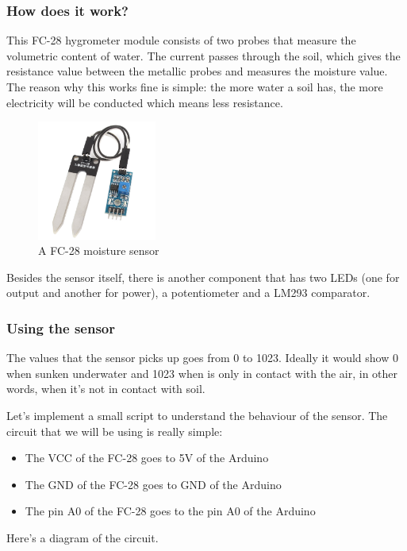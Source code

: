 \subsubsection{How does it work?}
This FC-28 hygrometer module consists of two probes that measure the volumetric content of water. The current passes through the soil, which gives the resistance value between the metallic probes and measures the moisture value. The reason why this works fine is simple: the more water a soil has, the more electricity will be conducted which means less resistance.

\begin{figure}[H]
    \centering
    \includegraphics[width=0.35\textwidth]{fig/fc28.jpg}
    \caption{A FC-28 moisture sensor}
    \label{fig:fc28}
\end{figure}

Besides the sensor itself, there is another component that has two LEDs (one for output and another for power), a potentiometer and a LM293 comparator.

\subsubsection{Using the sensor}
The values that the sensor picks up goes from 0 to 1023. Ideally it would show 0 when sunken underwater and 1023 when is only in contact with the air, in other words, when it's not in contact with soil.

Let's implement a small script to understand the behaviour of the sensor. The circuit that we will be using is really simple:
\begin{itemize}
	\item The VCC of the FC-28 goes to 5V of the Arduino
	\item The GND of the FC-28 goes to GND of the Arduino
	\item The pin A0 of the FC-28 goes to the pin A0 of the Arduino
\end{itemize}
Here's a diagram of the circuit.

